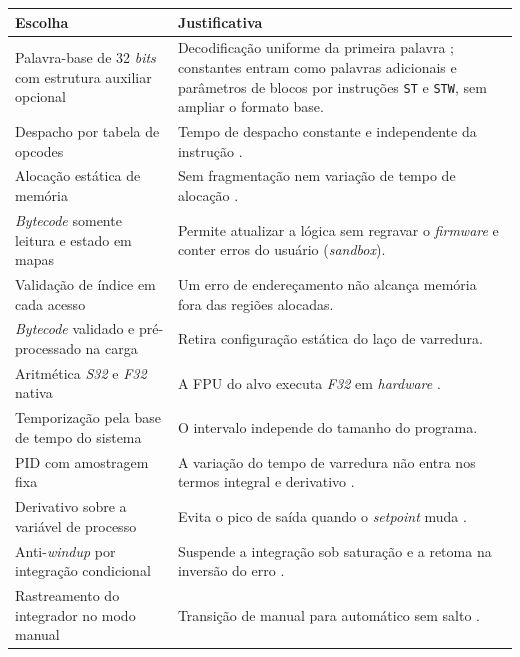 \begin{quadrofixo}
    \centering
    \begin{tabular}{|p{4.7cm}|p{9.7cm}|}
        \hline
        Escolha & Justificativa \\
        \hline
        Palavra-base de 32 \textit{bits} com estrutura auxiliar opcional & Decodificação uniforme da primeira palavra \cite{patterson:2020}; constantes entram como palavras adicionais e parâmetros de blocos por instruções \texttt{ST} e \texttt{STW}, sem ampliar o formato base. \\
        \hline
        Despacho por tabela de opcodes & Tempo de despacho constante e independente da instrução \cite{liu:2000}. \\
        \hline
        Alocação estática de memória & Sem fragmentação nem variação de tempo de alocação \cite{liu:2000}. \\
        \hline
        \textit{Bytecode} somente leitura e estado em mapas & Permite atualizar a lógica sem regravar o \textit{firmware} e conter erros do usuário (\textit{sandbox}). \\
        \hline
        Validação de índice em cada acesso & Um erro de endereçamento não alcança memória fora das regiões alocadas. \\
        \hline
        \textit{Bytecode} validado e pré-processado na carga & Retira configuração estática do laço de varredura. \\
        \hline
        Aritmética \textit{S32} e \textit{F32} nativa & A FPU do alvo executa \textit{F32} em \textit{hardware} \cite{st:ds11532}. \\
        \hline
        Temporização pela base de tempo do sistema & O intervalo independe do tamanho do programa. \\
        \hline
        PID com amostragem fixa & A variação do tempo de varredura não entra nos termos integral e derivativo \cite{astrom:2006}. \\
        \hline
        Derivativo sobre a variável de processo & Evita o pico de saída quando o \textit{setpoint} muda \cite{astrom:2006}. \\
        \hline
        Anti-\textit{windup} por integração condicional & Suspende a integração sob saturação e a retoma na inversão do erro \cite{astrom:2006}. \\
        \hline
        Rastreamento do integrador no modo manual & Transição de manual para automático sem salto \cite{astrom:2006}. \\
        \hline

\end{tabular}
\end{quadrofixo}
